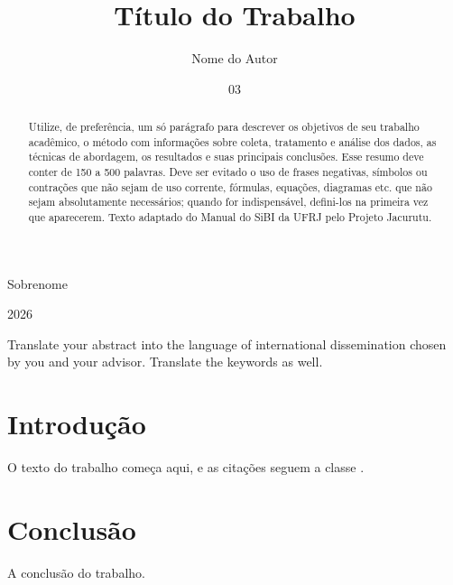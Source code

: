 \documentclass[msc]{ufrj}   %
\begin{document}
  \title{Título do Trabalho}
  \author{Nome do Autor}{Sobrenome}
  \date{03}{2026}


  \maketitle
  \frontmatter
  \begin{abstract}
    Utilize, de preferência, um só parágrafo para descrever os objetivos de
    seu trabalho acadêmico, o método com informações sobre coleta, tratamento
    e análise dos dados, as técnicas de abordagem, os resultados e suas
    principais conclusões. Esse resumo deve conter de 150 a 500 palavras. Deve
    ser evitado o uso de frases negativas, símbolos ou contrações que não
    sejam de uso corrente, fórmulas, equações, diagramas etc. que não sejam
    absolutamente necessários; quando for indispensável, defini-los na
    primeira vez que aparecerem. Texto adaptado do Manual do SiBI da UFRJ pelo
    Projeto Jacurutu.
  \end{abstract}
  \begin{foreignabstract}
    Translate your abstract into the language of international dissemination
    chosen by you and your advisor. Translate the keywords as well.
  \end{foreignabstract}
  \tableofcontents

  \mainmatter
  \chapter{Introdução}
  O texto do trabalho começa aqui, e as citações seguem a classe
  \cite{m-4211}.

  \chapter{Conclusão}
  A conclusão do trabalho.

  \backmatter
  \printbibliography
\end{document}
